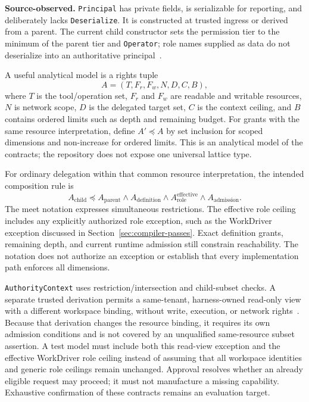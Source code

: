 \textbf{Source-observed.} \texttt{Principal} has private fields, is serializable for reporting, and deliberately lacks \texttt{Deserialize}. It is constructed at trusted ingress or derived from a parent. The current child constructor sets the permission tier to the minimum of the parent tier and \texttt{Operator}; role names supplied as data do not deserialize into an authoritative principal~\cite{ref13}.

A useful analytical model is a rights tuple
\begin{equation}
  A = (T, F_r, F_w, N, D, C, B),
  \label{eq:rights}
\end{equation}
where $T$ is the tool/operation set, $F_r$ and $F_w$ are readable and writable resources, $N$ is network scope, $D$ is the delegated target set, $C$ is the context ceiling, and $B$ contains ordered limits such as depth and remaining budget. For grants with the same resource interpretation, define $A' \preceq A$ by set inclusion for scoped dimensions and non-increase for ordered limits. This is an analytical model of the contracts; the repository does not expose one universal lattice type.

For ordinary delegation within that common resource interpretation, the intended composition rule is
\begin{equation}
  A_{\mathrm{child}} \preceq
  A_{\mathrm{parent}} \wedge A_{\mathrm{definition}}
  \wedge A_{\mathrm{role}}^{\mathrm{effective}}
  \wedge A_{\mathrm{admission}}.
  \label{eq:attenuation}
\end{equation}
The meet notation expresses simultaneous restrictions. The effective role ceiling includes any explicitly authorized role exception, such as the WorkDriver exception discussed in Section~\ref{sec:compiler-passes}. Exact definition grants, remaining depth, and current runtime admission still constrain reachability. The notation does not authorize an exception or establish that every implementation path enforces all dimensions.

\texttt{AuthorityContext} uses restriction/intersection and child-subset checks. A separate trusted derivation permits a same-tenant, harness-owned read-only view with a different workspace binding, without write, execution, or network rights~\cite{ref14}. Because that derivation changes the resource binding, it requires its own admission conditions and is not covered by an unqualified same-resource subset assertion. A test model must include both this read-view exception and the effective WorkDriver role ceiling instead of assuming that all workspace identities and generic role ceilings remain unchanged. Approval resolves whether an already eligible request may proceed; it must not manufacture a missing capability. Exhaustive confirmation of these contracts remains an evaluation target.

